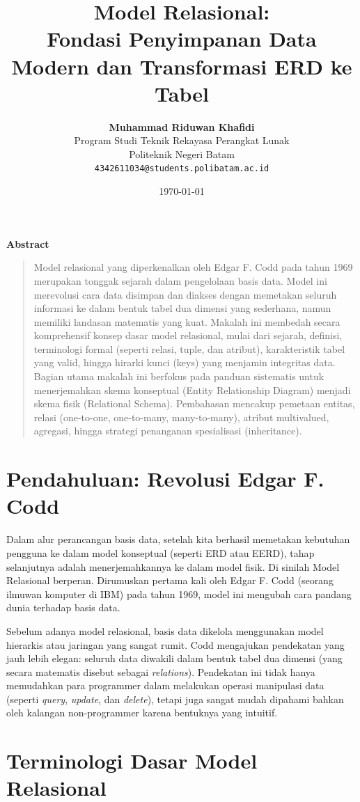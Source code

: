 \documentclass[11pt,a4paper]{article}
\title{\vspace{-1.5cm}\textbf{\sffamily\LARGE Model Relasional:\\ Fondasi Penyimpanan Data Modern dan Transformasi ERD ke Tabel}}
\author{
	\textbf{Muhammad Riduwan Khafidi} \\
	\small Program Studi Teknik Rekayasa Perangkat Lunak \\
	\small Politeknik Negeri Batam \\
	\small \texttt{4342611034@students.polibatam.ac.id}
}
\date{\small\today}
\renewenvironment{abstract}
{\small
	\begin{center}\textbf{\sffamily Abstract}\end{center}
	\begin{quote}}
	{\end{quote}}
\begin{document}
\maketitle
\thispagestyle{empty}

\begin{abstract}
	Model relasional yang diperkenalkan oleh Edgar F. Codd pada tahun 1969 merupakan tonggak sejarah dalam pengelolaan basis data. Model ini merevolusi cara data disimpan dan diakses dengan memetakan seluruh informasi ke dalam bentuk tabel dua dimensi yang sederhana, namun memiliki landasan matematis yang kuat. Makalah ini membedah secara komprehensif konsep dasar model relasional, mulai dari sejarah, definisi, terminologi formal (seperti relasi, tuple, dan atribut), karakteristik tabel yang valid, hingga hirarki kunci (keys) yang menjamin integritas data. Bagian utama makalah ini berfokus pada panduan sistematis untuk menerjemahkan skema konseptual (Entity Relationship Diagram) menjadi skema fisik (Relational Schema). Pembahasan mencakup pemetaan entitas, relasi (one-to-one, one-to-many, many-to-many), atribut multivalued, agregasi, hingga strategi penanganan spesialisasi (inheritance).
\end{abstract}

\section{Pendahuluan: Revolusi Edgar F. Codd}

Dalam alur perancangan basis data, setelah kita berhasil memetakan kebutuhan pengguna ke dalam model konseptual (seperti ERD atau EERD), tahap selanjutnya adalah menerjemahkannya ke dalam model fisik. Di sinilah Model Relasional berperan. Dirumuskan pertama kali oleh Edgar F. Codd (seorang ilmuwan komputer di IBM) pada tahun 1969, model ini mengubah cara pandang dunia terhadap basis data.

Sebelum adanya model relasional, basis data dikelola menggunakan model hierarkis atau jaringan yang sangat rumit. Codd mengajukan pendekatan yang jauh lebih elegan: seluruh data diwakili dalam bentuk tabel dua dimensi (yang secara matematis disebut sebagai \textit{relations}). Pendekatan ini tidak hanya memudahkan para programmer dalam melakukan operasi manipulasi data (seperti \textit{query}, \textit{update}, dan \textit{delete}), tetapi juga sangat mudah dipahami bahkan oleh kalangan non-programmer karena bentuknya yang intuitif.

\section{Terminologi Dasar Model Relasional}
\end{document}
